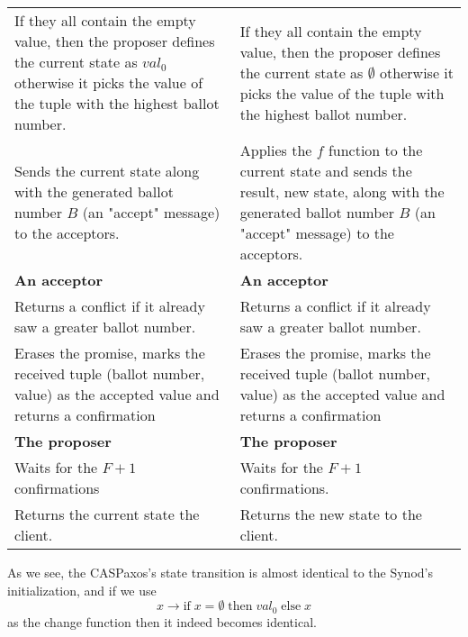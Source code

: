 \documentclass[12pt]{article}
\theoremstyle{definition}
\begin{document}
\begin{center}
\begin{longtable}{p{15em}|p{15em}}
  
  If they all contain the empty value, then the proposer defines the current state as $val_0$ otherwise it picks the value of the tuple with the highest ballot number.
  &
  If they all contain the empty value, then the proposer defines the current state as $\emptyset$ otherwise it picks the value of the tuple with the highest ballot number.
  \\[6pt]
  
  
  Sends the current state along with the generated ballot number $B$ (an "accept" message) to the acceptors.
  &
  Applies the $f$ function to the current state and sends the result, new state, along with the generated ballot number $B$ (an "accept" message) to the acceptors.
  \\[6pt]
  
  \hline
  
  {\bf An acceptor}
  &
  {\bf An acceptor} \\[6pt]
  
  
  Returns a conflict if it already saw a greater ballot number.
  &
  Returns a conflict if it already saw a greater ballot number.
  \\[6pt]
  
  
  Erases the promise, marks the received tuple (ballot number, value) as the accepted value and returns a confirmation
  &
  Erases the promise, marks the received tuple (ballot number, value) as the accepted value and returns a confirmation
  \\[6pt]
  
  \hline

  {\bf The proposer}
  &
  {\bf The proposer} \\[6pt]

  
  Waits for the $F+1$ confirmations
  &
  Waits for the $F+1$ confirmations. \\[6pt]
  
  
  Returns the current state the client.
  &
  Returns the new state to the client. \\[6pt]
  
  \hline
\end{longtable}
\end{center}

As we see, the CASPaxos's state transition is almost identical to the Synod's initialization, and if we use
$$x \to \mbox{if}\; x = \emptyset \;\mbox{then}\; val_0\; \mbox{else}\; x$$
as the change function then it indeed becomes identical.
\end{document}
